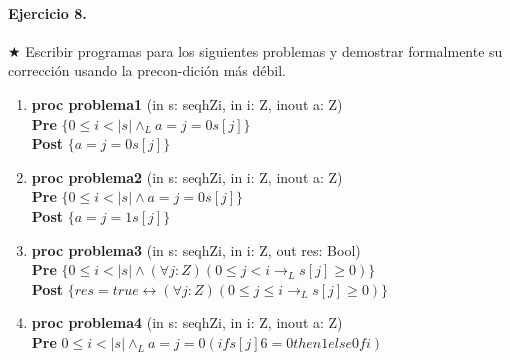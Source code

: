 \documentclass[a4paper]{article}
\begin{document}
\paragraph{Ejercicio 8.} $\bigstar$ Escribir programas para los siguientes problemas y demostrar 
formalmente su corrección usando la precon-dición más débil.

\begin{enumerate}[label=\alph*)]
\item \textbf{proc problema1 }(in s: seqhZi, in i: Z, inout a: Z) {\\
                                   
   \hspace*{6mm} \textbf{Pre }$\{0 \leq i < |s| \wedge_L a = j=0 s[j]\}$\\
                    
   \hspace*{6mm} \textbf{Post }$\{a = j=0 s[j]\}$\\
   }

\item \textbf{proc problema2 }(in s: seqhZi, in i: Z, inout a: Z) {\\
                                  
   \hspace*{6mm} \textbf{Pre }$\{0 \leq i < |s| \wedge a = j=0 s[j]\}$\\
                    
   \hspace*{6mm} \textbf{Post }$\{a = j=1 s[j]\}$\\
   }

\item \textbf{proc problema3 }(in s: seqhZi, in i: Z, out res: Bool) {\\
   \hspace*{6mm} \textbf{Pre }$\{0 \leq i < |s| \wedge 
   		(\forall j :Z)(0 \leq j < i \rightarrow_L s[j] \geq 0)\}$\\
   \hspace*{6mm} \textbf{Post }$\{res = true \leftrightarrow (\forall j :Z)
          (0 \leq j \leq i \rightarrow_L s[j] \geq 0)\}$\\
   }

\item \textbf{proc problema4 }(in s: seqhZi, in i: Z, inout a: Z) {\\
                                   
   \hspace*{6mm} \textbf{Pre }${0 \leq i < |s| \wedge_L a = j=0 (if s[j] 6= 0 
   		then 1 else 0 fi)}$\\
                   
}
\end{enumerate}
\end{document}
